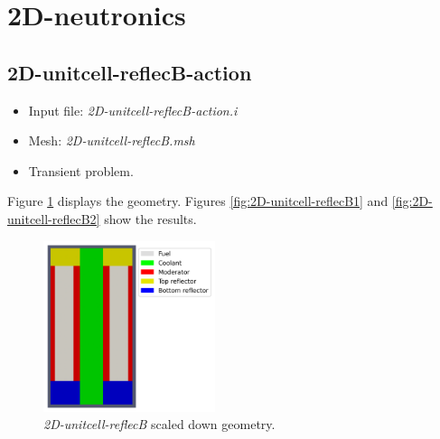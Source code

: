 \documentclass[11pt,letterpaper]{article}
\begin{document}
\section{2D-neutronics}

\subsection{2D-unitcell-reflecB-action}

	\begin{itemize}
		\item Input file: \textit{2D-unitcell-reflecB-action.i}
		\item Mesh: \textit{2D-unitcell-reflecB.msh}
		\item Transient problem.
	\end{itemize}

Figure \ref{fig:2D-unitcell-reflecB} displays the geometry.
Figures \ref{fig:2D-unitcell-reflecB1} and \ref{fig:2D-unitcell-reflecB2} show the results.

	\begin{figure}[htbp!]
		\centering
		\includegraphics[height=5cm]{2D-unitcell-reflecB-meshB}
		\caption{\textit{2D-unitcell-reflecB} scaled down geometry.}
		\label{fig:2D-unitcell-reflecB}
	\end{figure}
\end{document}
